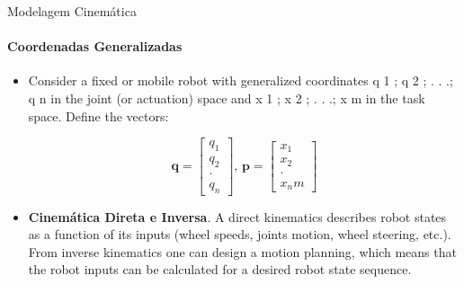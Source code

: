 \documentclass{beamer}
\begin{document}
\begin{frame}{Modelagem Cinemática}
    \framesubtitle{Coordenadas Generalizadas}
    \begin{itemize}
        \item Consider a fixed or mobile robot with generalized coordinates q 1 ; q 2 ; . . .; q n in the
        joint (or actuation) space and x 1 ; x 2 ; . . .; x m in the task space. Define the vectors:

        \begin{equation*}
            \mathbf{q} = 
            \begin{bmatrix}
                q_1 \\q_2 \\ \cdot  \\ q_n
            \end{bmatrix}
            \text{, }
            \mathbf{p} = 
            \begin{bmatrix}
                x_1 \\x_2 \\ \cdot  \\ x_nm
            \end{bmatrix}
        \end{equation*}

        \item \textbf{Cinemática Direta e Inversa}. A direct kinematics describes
robot states as a function of its inputs (wheel speeds, joints motion,
wheel steering, etc.). From inverse kinematics one can design a motion
planning, which means that the robot inputs can be calculated for a
desired robot state sequence.

    \end{itemize}        
\end{frame}
\end{document}
